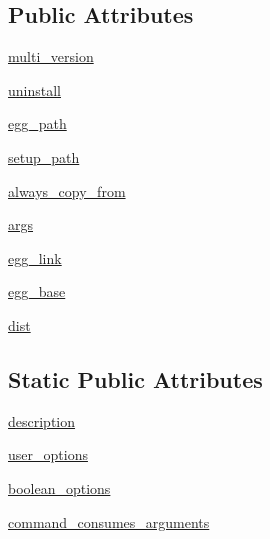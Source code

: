 \subsection*{Public Attributes}
\begin{DoxyCompactItemize}
\item 
\hyperlink{classsetuptools_1_1command_1_1develop_1_1develop_ab58617aafb9fd2d0bd6f86c5b0c88b6b}{multi\+\_\+version}
\item 
\hyperlink{classsetuptools_1_1command_1_1develop_1_1develop_a40763517d7b5632fc6b6cec1838789c7}{uninstall}
\item 
\hyperlink{classsetuptools_1_1command_1_1develop_1_1develop_a00b4e23b88ef9ea02cd228ec7f17f3bd}{egg\+\_\+path}
\item 
\hyperlink{classsetuptools_1_1command_1_1develop_1_1develop_aebd7d6fb89f85612802017ae8913a34f}{setup\+\_\+path}
\item 
\hyperlink{classsetuptools_1_1command_1_1develop_1_1develop_a964d71769a4edaf14101e17649670ef2}{always\+\_\+copy\+\_\+from}
\item 
\hyperlink{classsetuptools_1_1command_1_1develop_1_1develop_af5f6f07fcb7884261ca12f7e12d93c09}{args}
\item 
\hyperlink{classsetuptools_1_1command_1_1develop_1_1develop_a6025e993026dbb3bc7922c1b61459d38}{egg\+\_\+link}
\item 
\hyperlink{classsetuptools_1_1command_1_1develop_1_1develop_a09767fa04a16fe9a2f8d2dc828391b3f}{egg\+\_\+base}
\item 
\hyperlink{classsetuptools_1_1command_1_1develop_1_1develop_afe57f6e30fcbd487d024ab2dfa587630}{dist}
\end{DoxyCompactItemize}
\subsection*{Static Public Attributes}
\begin{DoxyCompactItemize}
\item 
\hyperlink{classsetuptools_1_1command_1_1develop_1_1develop_a9580e4b9d23809b3d7e7bee6219f08bc}{description}
\item 
\hyperlink{classsetuptools_1_1command_1_1develop_1_1develop_a15c186fbc5a69ae8a812b79d24b72fe8}{user\+\_\+options}
\item 
\hyperlink{classsetuptools_1_1command_1_1develop_1_1develop_a315988570a8a8d9bde570d8d94839c70}{boolean\+\_\+options}
\item 
\hyperlink{classsetuptools_1_1command_1_1develop_1_1develop_af26405dfc9f37ec28fbae36dc354e0c2}{command\+\_\+consumes\+\_\+arguments}
\end{DoxyCompactItemize}


